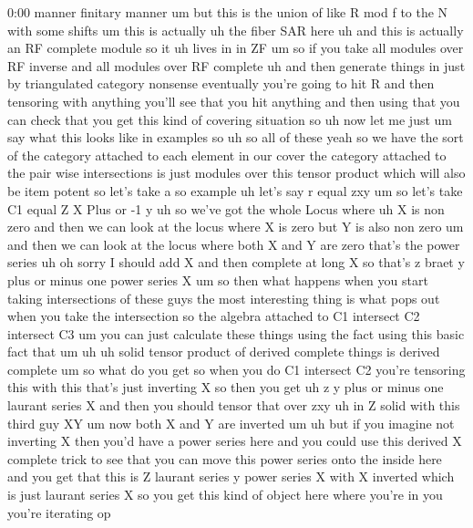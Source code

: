 \begin{unfinished}{0:00}
manner  finitary
manner  um  but  this  is  the  union  of  like
R  mod  f  to  the  N  with  some
shifts  um  this  is  actually  uh  the  fiber
SAR
here  uh  and  this  is  actually  an  RF
complete
module  so  it  uh  lives  in  in
ZF  um  so  if  you  take
all  modules  over  RF  inverse  and  all
modules  over  RF  complete  uh  and  then
generate  things  in  just  by  triangulated
category  nonsense  eventually  you're
going  to  hit  R  and  then  tensoring  with
anything  you'll  see  that  you  hit
anything  and  then  using  that  you  can
check  that  you  get  this  kind  of  covering
situation
so
uh  now  let  me
just
um  say  what  this  looks  like  in
examples
so  uh  so  all  of  these  yeah  so  we  have
the  sort  of  the  category  attached  to
each  element  in  our  cover  the  category
attached  to  the  pair  wise  intersections
is  just  modules  over  this  tensor  product
which  will  also  be  item  potent  so  let's
take  a  so  example  uh  let's  say  r  equal
zxy
um  so  let's  take  C1  equal  Z  X  Plus  or  -1
y  uh  so  we've  got  the  whole  Locus  where
uh  X  is  non  zero  and  then  we  can  look  at
the  locus  where  X  is  zero  but  Y  is  also
non
zero  um  and  then  we  can  look  at  the
locus
where  both  X  and  Y  are
zero
that's  the  power
series  uh  oh  sorry  I  should  add  X  and
then  complete  at  long  X  so  that's  z
braet  y  plus  or  minus  one  power  series
X
um  so  then  what  happens  when  you  start
taking  intersections  of  these  guys  the
most  interesting  thing  is  what  pops  out
when  you  take  the  intersection  so  the
algebra  attached  to  C1  intersect  C2
intersect  C3  um  you  can  just  calculate
these  things  using  the  fact  using  this
basic  fact  that
um  uh  uh  solid  tensor  product  of  derived
complete  things  is  derived  complete  um
so  what  do  you  get  so  when  you  do  C1
intersect  C2  you're  tensoring  this  with
this  that's  just  inverting  X  so  then  you
get  uh  z  y  plus  or  minus  one  laurant
series  X  and  then  you  should  tensor  that
over
zxy  uh  in  Z  solid  with  this  third
guy
XY  um  now  both  X  and  Y  are
inverted
um  uh  but  if  you  imagine  not  inverting  X
then  you'd  have  a  power  series  here  and
you  could  use  this  derived  X  complete
trick  to  see  that  you  can  move  this
power  series  onto  the  inside  here  and
you  get  that  this  is  Z  laurant  series  y
power  series  X  with  X  inverted  which  is
just  laurant  series  X
so  you  get  this  kind  of  object  here
where  you're  in  you  you're  iterating  op

\end{unfinished}
